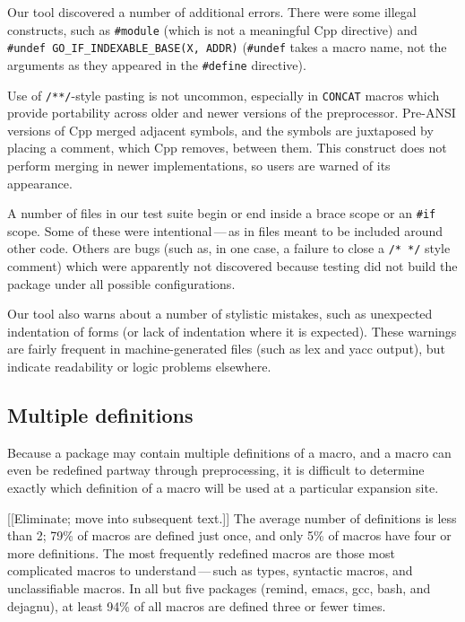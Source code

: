 \documentclass[10pt]{article}
\newcommand{\pkg}[1]{\textsf{#1}}
\begin{document}
Our tool discovered a number of additional
errors.  There were some illegal constructs, such as {\tt \#module} (which
is not a meaningful Cpp directive) and {\tt \#undef
\verb|GO_IF_INDEXABLE_BASE|(X, ADDR)} ({\tt \#undef} takes a macro name,
not the arguments as they appeared in the {\tt \#define} directive).
  
Use of {\tt /**/}-style pasting is not uncommon, especially in {\tt CONCAT}
macros which provide portability across older and newer versions of the
preprocessor.  Pre-ANSI versions of Cpp merged adjacent symbols, and the
symbols are juxtaposed by placing a comment, which Cpp removes, between
them.  This construct does not perform merging in newer implementations,
so users are warned of its appearance.

A number of files in our test suite begin or end inside a brace scope or an
{\tt \#if} scope.  Some of these were intentional\,---\,as in files meant
to be included around other code.  Others are bugs (such as, in one case, a
failure to close a {\tt /* */} style comment) which were apparently not
discovered because testing did not build the package under all possible
configurations.

Our tool also warns about a number of stylistic mistakes, such as
unexpected indentation of forms (or lack of indentation where it is
expected).  These warnings are fairly frequent in machine-generated files
(such as lex and yacc output), but indicate readability or logic problems
elsewhere.


\subsection{Multiple definitions}
\label{sec:mult-def}

Because a package may contain multiple definitions of a macro, and a macro
can even be redefined partway through preprocessing, it is difficult to
determine exactly which definition of a macro will be used at a particular
expansion site.

[[Eliminate; move into subsequent text.]]  The average number of
definitions is less than 2; 79\% of macros are defined just once, and only
5\% of macros have four or more definitions.  The most frequently redefined
macros are those most complicated macros to understand\,---\,such as types,
syntactic macros, and unclassifiable macros.  In all but five packages
(\pkg{remind}, \pkg{emacs}, \pkg{gcc}, \pkg{bash}, and \pkg{dejagnu}), at
least 94\% of all macros are defined three or fewer times.
\end{document}

